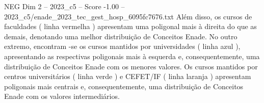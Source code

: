 \begin{textsample}{NEG Dim 2 – 2023\_c5 – Score -1.00 – 2023\_c5/enade\_2023\_tec\_gest\_hosp\_6095fc7676.txt}
Além disso, os cursos de faculdades ( linha vermelha ) apresentam uma poligonal mais à direita do que as demais, denotando uma melhor distribuição de Conceitos Enade.
No outro extremo, encontram -se os cursos mantidos por universidades ( linha azul ), apresentando as respectivas poligonais mais à esquerda e, consequentemente, uma distribuição de Conceitos Enade com os menores valores.
Os cursos mantidos por centros universitários ( linha verde ) e CEFET/IF ( linha laranja ) apresentam poligonais mais centrais e, consequentemente, uma distribuição de Conceitos Enade com os valores intermediários.

\end{textsample}

